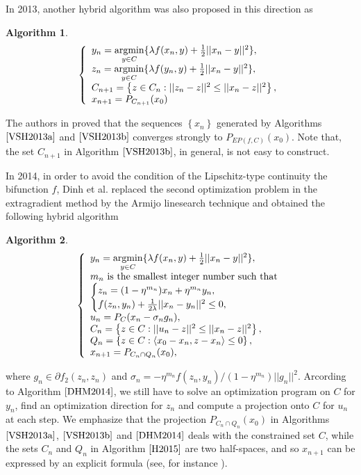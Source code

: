 \documentclass{aims}
\theoremstyle{definition}
\newtheorem{algorithm}{Algorithm}
\begin{document}
\noindent In 2013, another hybrid algorithm \cite[Algorithm 1]{VSH2013} was also proposed in this direction as
\begin{algorithm}\label{VSH2013b}
$$
\left \{
\begin{array}{ll}
y_n=  \underset{y\in C}{\rm argmin} \{ \lambda f(x_n, y) +\frac{1}{2}||x_n-y||^2\},\\ 
z_n = \underset{y\in C}{\rm argmin}\{ \lambda f(y_n, y) +\frac{1}{2}||x_n-y||^2\},\\
C_{n+1}=\left\{z\in C_n:||z_n-z||^2\le||x_n-z||^2\right\},\\
x_{n+1}=P_{C_{n+1}}(x_0)
\end{array}
\right.
$$
\end{algorithm}
\noindent The authors in \cite{VSH2013,VSN2012} proved that the sequences $\left\{x_n\right\}$ generated by Algorithms $\ref{VSH2013a}$ 
and $\ref{VSH2013b}$ converges strongly to  $P_{EP(f,C)}(x_0)$. Note that, the set $C_{n+1}$ in Algorithm $\ref{VSH2013b}$, in general, 
is not easy to construct. 

In 2014, in order to avoid the condition of the Lipschitz-type continuity the bifunction $f$, Dinh et al. \cite{DHM2014} replaced the second 
optimization problem in the extragradient method by the Armijo linesearch technique and obtained the following hybrid algorithm
\begin{algorithm}\label{DHM2014}
$$
\left \{
\begin{array}{ll}
y_n=  \underset{y\in C}{\rm argmin} \{ \lambda f(x_n, y) +\frac{1}{2}||x_n-y||^2\},\\ 
m_n~ \mbox{\rm is the smallest integer number such that}\\
\begin{cases}
z_n= (1-\eta^{m_n})x_n+\eta^{m_n}y_n,\\ 
f( z_n,y_n )+\frac{1}{2\lambda}||x_n-y_n||^2\le 0,
\end{cases}\\
u_n=P_C(x_n-\sigma_n g_n),\\
C_{n}=\left\{z\in C:||u_n-z||^2\le||x_n-z||^2\right\},\\
Q_n=\left\{z\in C:\left\langle x_0-x_n,z-x_n\right\rangle\le 0\right\},\\
x_{n+1}=P_{C_n\cap Q_n}(x_0),
\end{array}
\right.
$$
\end{algorithm}
\noindent where $g_n\in \partial f_2(z_n,z_n)$ and $\sigma_n=-\eta^{m_n}f(z_n,y_n)/(1-\eta^{m_n})||g_n||^2$. 
Arcording to Algorithm $\ref{DHM2014}$, we still have to solve an optimization program on $C$ for $y_n$, find an optimization direction for $z_n$ 
and compute a projection onto $C$ for $u_n$ at each step. We emphasize that the projection $P_{C_n\cap Q_n}(x_0)$ in Algorithms $\ref{VSH2013a}$, $\ref{VSH2013b}$ and $\ref{DHM2014}$ deals with 
the constrained set $C$, while the sets $C_n$ and $Q_n$ in Algorithm 
$\ref{H2015}$ are two half-spaces, and so $x_{n+1}$ can be expressed by an explicit formula (see, for instance \cite{CH2005,SS2000}).
\end{document}
